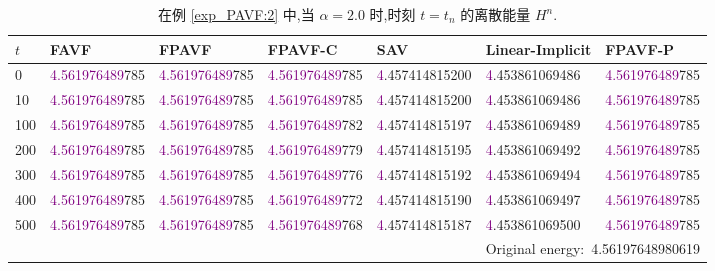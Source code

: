 \documentclass[aspectratio=169]{beamer}
\numberwithin{theorem}{section} %
\numberwithin{equation}{section}%
\numberwithin{figure}{section}%
\numberwithin{table}{section}%
\begin{document}
\begin{frame}%

	\begin{table}[H]\tiny
		\centering
		\caption{在例 \ref{exp_PAVF:2} 中,当 $\alpha=2.0$ 时,时刻 $t=t_n$ 的离散能量 $H^n$.}
	
		  \begin{tabular}{lllllll}
		  \toprule
		   $t$   &FAVF   &FPAVF   &FPAVF-C   &SAV    &Linear-Implicit   &FPAVF-P\\
		  \midrule
		  0     &\textcolor{purple}{4.561976489}785   &\textcolor{purple}{4.561976489}785   &\textcolor{purple}{4.561976489}785   &\textcolor{purple}{4}.457414815200   &\textcolor{purple}{4}.453861069486   &\textcolor{purple}{4.561976489}785 \\
		  10    &\textcolor{purple}{4.561976489}785   &\textcolor{purple}{4.561976489}785   &\textcolor{purple}{4.561976489}785   &\textcolor{purple}{4}.457414815200   &\textcolor{purple}{4}.453861069486   &\textcolor{purple}{4.561976489}785 \\
		  100   &\textcolor{purple}{4.561976489}785   &\textcolor{purple}{4.561976489}785   &\textcolor{purple}{4.561976489}782   &\textcolor{purple}{4}.457414815197   &\textcolor{purple}{4}.453861069489   &\textcolor{purple}{4.561976489}785 \\
		  200   &\textcolor{purple}{4.561976489}785   &\textcolor{purple}{4.561976489}785   &\textcolor{purple}{4.561976489}779   &\textcolor{purple}{4}.457414815195   &\textcolor{purple}{4}.453861069492   &\textcolor{purple}{4.561976489}785 \\
		  300   &\textcolor{purple}{4.561976489}785   &\textcolor{purple}{4.561976489}785   &\textcolor{purple}{4.561976489}776   &\textcolor{purple}{4}.457414815192   &\textcolor{purple}{4}.453861069494   &\textcolor{purple}{4.561976489}785 \\
		  400   &\textcolor{purple}{4.561976489}785   &\textcolor{purple}{4.561976489}785   &\textcolor{purple}{4.561976489}772   &\textcolor{purple}{4}.457414815190   &\textcolor{purple}{4}.453861069497   &\textcolor{purple}{4.561976489}785 \\
		  500   &\textcolor{purple}{4.561976489}785   &\textcolor{purple}{4.561976489}785   &\textcolor{purple}{4.561976489}768   &\textcolor{purple}{4}.457414815187   &\textcolor{purple}{4}.453861069500   &\textcolor{purple}{4.561976489}785 \\
		  \midrule
		  \multicolumn{7}{r}{Original energy:~4.56197648980619} \\
		  \bottomrule
		  \end{tabular}\label{tab_PAVF:1}%
	  \end{table}%
	

\end{frame}
\end{document}
